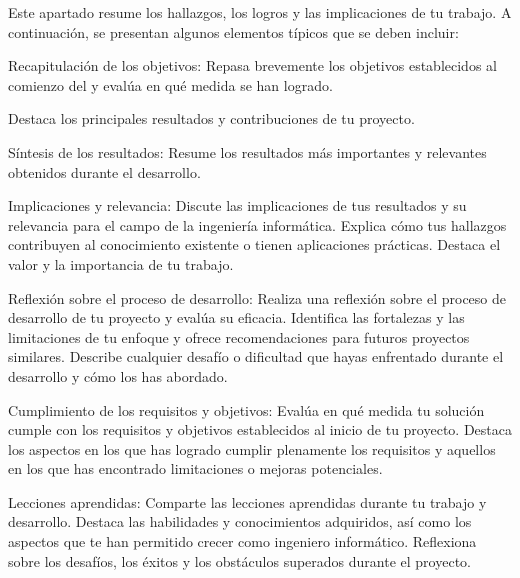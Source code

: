\begin{comment}
    \end{itemize}








    Las
    conclusiones deben ser claras, concisas y basadas en los resultados y
    la evidencia presentada en tu trabajo. Evita introducir nueva
    información en esta sección y enfócate en resumir los aspectos más
    destacados y significativos de tu trabajo.


\end{comment}

Este apartado resume los hallazgos, los logros y las implicaciones de tu trabajo.
A continuación, se presentan algunos elementos típicos que se deben incluir:

Recapitulación de los objetivos: Repasa brevemente los objetivos establecidos al comienzo del y evalúa en qué medida se
han logrado.

Destaca los principales resultados y contribuciones de tu proyecto.

Síntesis de los resultados: Resume los resultados más importantes y relevantes obtenidos durante el desarrollo.

Implicaciones y relevancia: Discute las implicaciones de tus resultados y su relevancia para el campo
de la ingeniería informática.
Explica cómo tus hallazgos contribuyen al conocimiento existente o tienen aplicaciones prácticas.
Destaca el valor y la importancia de tu trabajo.

Reflexión sobre el proceso de desarrollo: Realiza una reflexión sobre el proceso de desarrollo de tu proyecto y evalúa
su eficacia.
Identifica las fortalezas y las limitaciones de tu enfoque y ofrece recomendaciones para futuros proyectos similares.
Describe cualquier desafío o dificultad que hayas enfrentado durante el desarrollo y cómo los has abordado.

Cumplimiento de los requisitos y objetivos: Evalúa en qué medida tu solución cumple con los requisitos y objetivos
establecidos al inicio de tu proyecto.
Destaca los aspectos en los que has logrado cumplir plenamente los requisitos y aquellos en los que has encontrado
limitaciones o mejoras potenciales.

Lecciones aprendidas: Comparte las lecciones aprendidas durante tu trabajo y desarrollo.
Destaca las habilidades y conocimientos adquiridos, así como los aspectos que te han permitido crecer como ingeniero
informático.
Reflexiona sobre los desafíos, los éxitos y los obstáculos superados durante el proyecto.

